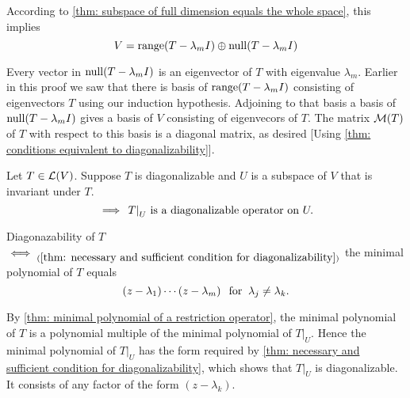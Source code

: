 \begin{prf}
  According to \ref{thm: subspace of full dimension equals the whole space}, this implies
  \begin{equation}
    V=\operatorname{range}(T-\lambda_m I) \oplus \operatorname{null} (T-\lambda_m I)
  \end{equation}

  Every vector in $\operatorname{null} (T-\lambda_m I)$ is an eigenvector of $T$ with eigenvalue $\lambda_m$. Earlier in this proof we saw that there is basis of $\operatorname{range}(T-\lambda_mI)$ consisting of eigenvectors $T$ using our induction hypothesis. Adjoining to that basis a basis of $\operatorname{null}(T-\lambda_mI)$ gives a basis of $V$ consisting of eigenvecors of $T$. The matrix $\mathcal{M}(T)$ of $T$ with respect to this basis is a diagonal matrix, as desired [Using \ref{thm: conditions equivalent to diagonalizability}].
\end{prf}

\setcounter{thm}{64}
\begin{thm}
  \label{thm: restriction of diagonalizable operator to invariant subspace}
  Let $T\in \mathcal{L}(V)$. Suppose $T$ is diagonalizable and $U$ is a subspace of $V$ that is invariant under $T$.
  \begin{equation}
    \implies$ $\left.T\right|_U$ is a diagonalizable operator on $U.
  \end{equation}
\end{thm}
\begin{prf}
  Diagonazability of $T$ $\iff_{(\ref{thm: necessary and sufficient condition for diagonalizability})}$ the minimal polynomial of $T$ equals
  \begin{equation}
    (z-\lambda_1)\cdots(z-\lambda_m) \;\;\, \text{for}\;\; \lambda_j \neq  \lambda_k.
  \end{equation}

  By \ref{thm: minimal polynomial of a restriction operator}, the minimal polynomial of $T$ is a polynomial multiple of the minimal polynomial of $\left.T\right|_U$.
  Hence the minimal polynomial of $\left.T\right|_U$  has the form required by \ref{thm: necessary and sufficient condition for diagonalizability}, which shows that $\left.T\right|_U$ is diagonalizable. It consists of any factor of the form $(z-\lambda_k)$.
\end{prf}

